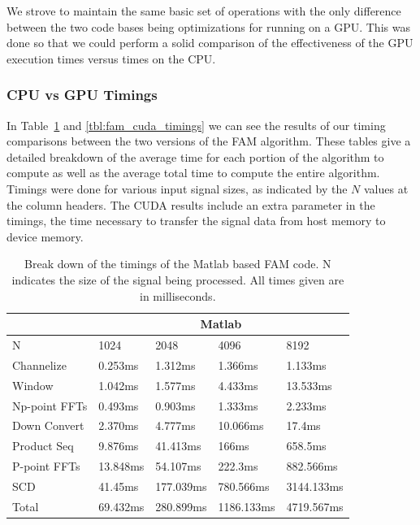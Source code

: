 We strove to maintain the same basic set of operations with the only difference between the two code bases being optimizations for running on a GPU.  This was done so that we could perform a solid comparison of the effectiveness of the GPU execution times versus times on the CPU.

\subsubsection{CPU vs GPU Timings}
In Table~\ref{tbl:fam_matlab_timings} and \ref{tbl:fam_cuda_timings} we can see the results of our timing comparisons between the two versions of the FAM algorithm.  These tables give a detailed breakdown of the average time for each portion of the algorithm to compute as well as the average total time to compute the entire algorithm.  Timings were done for various input signal sizes, as indicated by the $N$ values at the column headers.  The CUDA results include an extra parameter in the timings, the time necessary to transfer the signal data from host memory to device memory.

\begin{table}
\begin{center}
\begin{tabular}{|l|l|l|l|l|}
\hline
 & \multicolumn{4}{|c|}{Matlab} \\
\hline
N & 1024 & 2048 & 4096 & 8192 \\
\hline
Channelize & 0.253ms & 1.312ms & 1.366ms & 1.133ms \\
Window & 1.042ms & 1.577ms & 4.433ms & 13.533ms \\
Np-point FFTs & 0.493ms & 0.903ms & 1.333ms & 2.233ms \\
Down Convert & 2.370ms & 4.777ms & 10.066ms & 17.4ms \\
Product Seq & 9.876ms & 41.413ms & 166ms & 658.5ms \\
P-point FFTs & 13.848ms & 54.107ms & 222.3ms & 882.566ms \\
SCD & 41.45ms & 177.039ms & 780.566ms & 3144.133ms \\
\hline
Total & 69.432ms & 280.899ms & 1186.133ms & 4719.567ms \\
\hline
\end{tabular}
\vspace{0.5cm}
\caption{Break down of the timings of the Matlab based FAM code.  N indicates the size of the signal being processed.  All times given are in milliseconds.}
\label{tbl:fam_matlab_timings}
\end{center}
\end{table}


